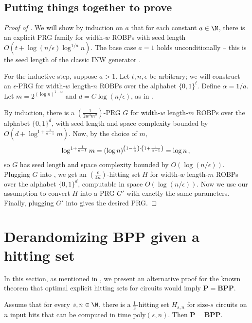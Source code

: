 \subsection{Putting things together to prove }
\begin{proof}[Proof of ]
We will show by induction on $a$ that for each constant $a \in \N$, there is an explicit PRG family for width-$w$ ROBPs with seed length $O(t + \log(n/\epsilon) \log^{1/a} n)$. The base case $a = 1$ holds unconditionally -- this is the seed length of the classic INW generator \cite{INW94}.

For the inductive step, suppose $a > 1$. Let $t, n, \epsilon$ be arbitrary; we will construct an $\epsilon$-PRG for width-$w$ length-$n$ ROBPs over the alphabet $\{0, 1\}^t$. Define $\alpha = 1/a$. Let $m = 2^{(\log n)^{1 - \alpha}}$ and $d = C \log(n/\epsilon)$, as in .

By induction, there is a $(\frac{1}{2w^3 m^2})$-PRG $G$ for width-$w$ length-$m$ ROBPs over the alphabet $\{0, 1\}^d$, with seed length and space complexity bounded by $O(d + \log^{1 + \frac{1}{a - 1}} m)$. Now, by the choice of $m$,
$$
\log^{1 + \frac{1}{a - 1}} m = (\log n)^{\left(1 - \frac{1}{a}\right)\cdot \left(1 + \frac{1}{a - 1}\right)} = \log n\,, \\
$$
so $G$ has seed length and space complexity bounded by $O(\log(n/\epsilon))$. Plugging $G$ into , we get an $(\frac{\epsilon}{4n})$-hitting set $H$ for width-$w$ length-$m$ ROBPs over the alphabet $\{0, 1\}^d$, computable in space $O(\log(n/\epsilon))$. Now we use our assumption to convert $H$ into a PRG $G'$ with exactly the same parameters. Finally, plugging $G'$ into  gives the desired PRG.
\end{proof}

\section{Derandomizing $\mathbf{BPP}$ given a hitting set} \label{sec:bpp}

In this section, as mentioned in , we present an alternative proof for the known theorem that optimal explicit hitting sets for circuits would imply $\mathbf{P} = \mathbf{BPP}$.

\begin{theorem}
Assume that for every $s, n \in \N$, there is a $\frac{1}{2}$-hitting set $H_{s, n}$ for size-$s$ circuits on $n$ input bits that can be computed in time $\text{poly}(s, n)$. Then $\mathbf{P} = \mathbf{BPP}$.
\end{theorem}

